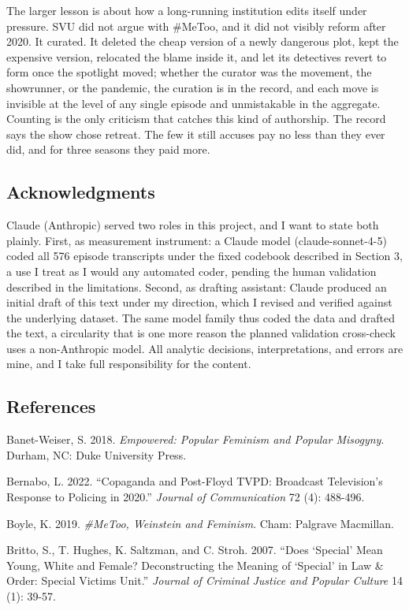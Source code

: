 \documentclass[
]{article}
\begin{document}
The larger lesson is about how a long-running institution edits itself
under pressure. SVU did not argue with \#MeToo, and it did not visibly
reform after 2020. It curated. It deleted the cheap version of a newly
dangerous plot, kept the expensive version, relocated the blame inside
it, and let its detectives revert to form once the spotlight moved;
whether the curator was the movement, the showrunner, or the pandemic,
the curation is in the record, and each move is invisible at the level
of any single episode and unmistakable in the aggregate. Counting is the
only criticism that catches this kind of authorship. The record says the
show chose retreat. The few it still accuses pay no less than they ever
did, and for three seasons they paid more.

\subsection{Acknowledgments}\label{acknowledgments}

Claude (Anthropic) served two roles in this project, and I want to state
both plainly. First, as measurement instrument: a Claude model
(claude-sonnet-4-5) coded all 576 episode transcripts under the fixed
codebook described in Section 3, a use I treat as I would any automated
coder, pending the human validation described in the limitations.
Second, as drafting assistant: Claude produced an initial draft of this
text under my direction, which I revised and verified against the
underlying dataset. The same model family thus coded the data and
drafted the text, a circularity that is one more reason the planned
validation cross-check uses a non-Anthropic model. All analytic
decisions, interpretations, and errors are mine, and I take full
responsibility for the content.

\subsection{References}\label{references}

Banet-Weiser, S. 2018. \emph{Empowered: Popular Feminism and Popular
Misogyny}. Durham, NC: Duke University Press.

Bernabo, L. 2022. ``Copaganda and Post-Floyd TVPD: Broadcast
Television's Response to Policing in 2020.'' \emph{Journal of
Communication} 72 (4): 488-496.

Boyle, K. 2019. \emph{\#MeToo, Weinstein and Feminism}. Cham: Palgrave
Macmillan.

Britto, S., T. Hughes, K. Saltzman, and C. Stroh. 2007. ``Does `Special'
Mean Young, White and Female? Deconstructing the Meaning of `Special' in
Law \& Order: Special Victims Unit.'' \emph{Journal of Criminal Justice
and Popular Culture} 14 (1): 39-57.
\end{document}
